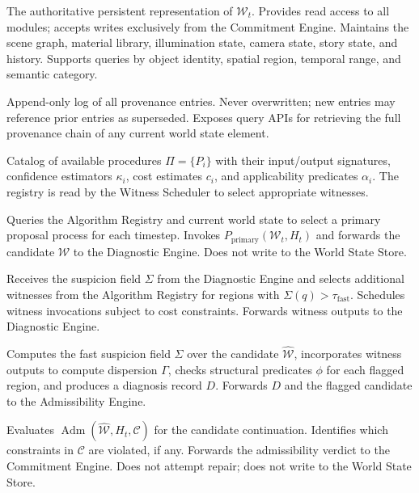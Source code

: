 \documentclass[12pt,a4paper]{article}
\theoremstyle{plain}
\theoremstyle{definition}
\theoremstyle{remark}
\DeclareMathOperator{\Adm}{Adm}
\begin{document}
\begin{description}[leftmargin=2em,itemsep=6pt]

\item[\textbf{World State Store (WSS).}] The authoritative persistent representation of $\mathcal{W}_t$. Provides read access to all modules; accepts writes exclusively from the Commitment Engine. Maintains the scene graph, material library, illumination state, camera state, story state, and history. Supports queries by object identity, spatial region, temporal range, and semantic category.

\item[\textbf{History/Provenance Store (HPS).}] Append-only log of all provenance entries. Never overwritten; new entries may reference prior entries as superseded. Exposes query APIs for retrieving the full provenance chain of any current world state element.

\item[\textbf{Algorithm Registry (AR).}] Catalog of available procedures $\Pi = \{P_i\}$ with their input/output signatures, confidence estimators $\kappa_i$, cost estimates $c_i$, and applicability predicates $\alpha_i$. The registry is read by the Witness Scheduler to select appropriate witnesses.

\item[\textbf{Proposal Engine (PE).}] Queries the Algorithm Registry and current world state to select a primary proposal process for each timestep. Invokes $P_{\mathrm{primary}}(\mathcal{W}_t, H_t)$ and forwards the candidate $\hat{\mathcal{W}}$ to the Diagnostic Engine. Does not write to the World State Store.

\item[\textbf{Witness Scheduler (WS).}] Receives the suspicion field $\Sigma$ from the Diagnostic Engine and selects additional witnesses from the Algorithm Registry for regions with $\Sigma(q) > \tau_{\mathrm{fast}}$. Schedules witness invocations subject to cost constraints. Forwards witness outputs to the Diagnostic Engine.

\item[\textbf{Diagnostic Engine (DE).}] Computes the fast suspicion field $\Sigma$ over the candidate $\hat{\mathcal{W}}$, incorporates witness outputs to compute dispersion $\Gamma$, checks structural predicates $\phi$ for each flagged region, and produces a diagnosis record $D$. Forwards $D$ and the flagged candidate to the Admissibility Engine.

\item[\textbf{Admissibility Engine (AE).}] Evaluates $\Adm(\hat{\mathcal{W}}, H_t, \mathcal{C})$ for the candidate continuation. Identifies which constraints in $\mathcal{C}$ are violated, if any. Forwards the admissibility verdict to the Commitment Engine. Does not attempt repair; does not write to the World State Store.


\end{description}
\end{document}
